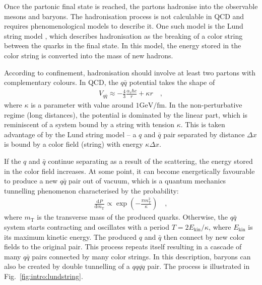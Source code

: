 Once the partonic final state is reached, the partons hadronise into the observable mesons and baryons. The hadronisation process is not calculable in QCD and requires phenomenological models to describe it. One such model is the Lund string model \cite{ferreres-soleSpaceTimeStructureHadronization2018}, which describes hadronisation as the breaking of a color string between the quarks in the final state. In this model, the energy stored in the color string is converted into the mass of new hadrons.

According to confinement, hadronisation should involve at least two partons with complementary colours. In QCD, the $q\bar{q}$ potential takes the shape of
\begin{align}\label{eq:intro:qqpot}
V_{q\bar{q}} \approx - \frac{4}{3}\frac{\alpha_s \hbar c}{r} + \kappa r \quad ,
\end{align}
where $\kappa$ is a parameter with value around $1 \mathrm{GeV} /\mathrm{fm}$. In the non-perturbative regime (long distances), the potential is dominated by the linear part, which is reminiscent of a system bound by a string with tension $\kappa$. This is taken advantage of by the Lund string model -- a $q$ and $\bar{q}$ pair separated by distance $\Delta x$ is bound by a color field (string) with energy $\kappa \Delta x$. 

If the $q$ and $\bar{q}$ continue separating as a result of the scattering, the energy stored in the color field increases. At some point, it can become energetically favourable to produce a new $q\bar{q}$ pair out of vacuum, which is a quantum mechanics tunnelling phenomenon characterised by the probability:
\begin{align}
\frac{\mathrm{d}P}{\mathrm{d}m_\mathrm{T}} \propto \exp \left( -\frac{\pi m_\mathrm{T}^2}{\kappa} \right) \quad ,
\label{eq:intro:tunnel}
\end{align}
where $m_\mathrm{T}$ is the transverse mass of the produced quarks. Otherwise, the $q\bar{q}$ system starts contracting and oscillates with a period $T = 2 E_\mathrm{kin}/\kappa$, where $E_\mathrm{kin}$ is its maximum kinetic energy. The produced $q$ and $\bar{q}$ then connect by new color fields to the original pair. This process repeats itself resulting in a cascade of many $q\bar{q}$ pairs connected by many color strings. In this description, baryons can also be created by double tunnelling of a $qq\overline{qq}$ pair. The process is illustrated in Fig.~\ref{fig:intro:lundstring}.


